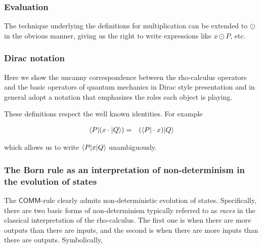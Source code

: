 \subsubsection{Evaluation}
The technique underlying the definitions for multiplication can be
extended to $\odot$ in the obvious manner, giving us the right to
write expressions like $x \odot P$, etc.

\subsubsection{Dirac notation}

Here we show the uncanny correspondence between the rho-calculus
operators and the basic operators of quantum mechanics in Dirac style
presentation and in general adopt a notation that emphasizes the roles
each object is playing.

\begin{table}[htp]
  \caption{QM - process calculi correspondences}
\end{table}

These definitions respect the well known identities. For example

\begin{eqnarray}
  \langle P \mathsf{|} (x\cdot \mathsf{|}Q \rangle) & = & (\langle P \mathsf{|} \cdot x) \mathsf{|}Q \rangle \nonumber
\end{eqnarray}

which allows us to write $\langle P \mathsf{|} x \mathsf{|} Q \rangle$ unambiguously.

\subsubsection{The Born rule as an interpretation of non-determinism in the evolution of states}

The $\mathsf{COMM}$-rule clearly admits non-deterministic evolution of
states. Specifically, there are two basic forms of non-determinism
typically referred to as \emph{races} in the classical interpretation
of the rho-calculus. The first one is when there are more outputs than
there are inputs, and the second is when there are more inputs than
there are outputs. Symbolically,

